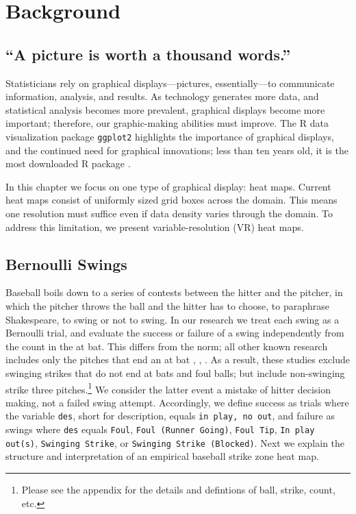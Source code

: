 \section{Background}
\subsection{``A picture is worth a thousand words.''}

Statisticians rely on graphical displays---pictures, essentially---to communicate information, analysis, and results. As technology generates more data, and statistical analysis becomes more prevalent, graphical displays become more important; therefore, our graphic-making abilities must improve. The R data visualization package \verb|ggplot2| highlights the importance of graphical displays, and the continued need for graphical innovations; less than ten years old, it is the most downloaded R package \citep{rdoc}.

In this chapter we focus on one type of graphical display: heat maps. Current heat maps consist of uniformly sized grid boxes across the domain. This means one resolution must suffice even if data density varies through the domain. To address this limitation, we present variable-resolution (VR) heat maps. %

\subsection{Bernoulli Swings}

Baseball boils down to a series of contests between the hitter and the pitcher, in which the pitcher throws the ball and the hitter has to choose, to paraphrase Shakespeare, to swing or not to swing. In our research we treat each swing as a Bernoulli trial, and evaluate the success or failure of a swing independently from the count in the at bat. This differs from the norm; all other known research includes only the pitches that end an at bat \citep{Cross2015}, \citep{Baumer2010}, \citep{Fast2011}. As a result, these studies exclude swinging strikes that do not end at bats and foul balls; but include non-swinging strike three pitches.\footnote{Please see the appendix for the details and defintions of ball, strike, count, etc.} We consider the latter event a mistake of hitter decision making, not a failed swing attempt.  
Accordingly, we define success as trials where the variable \verb|des|, short for description, equals \verb|in play, no out|, and failure as swings where \verb|des| equals \verb|Foul|, \verb|Foul (Runner Going)|, \verb|Foul Tip|, \verb|In play out(s)|, \verb|Swinging Strike|, or \verb|Swinging Strike (Blocked)|. Next we explain the structure and interpretation of an empirical baseball strike zone heat map.

